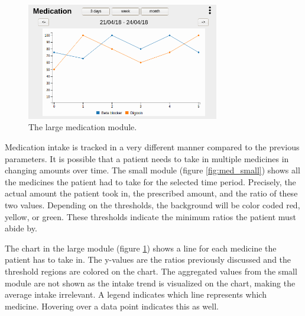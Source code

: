         \begin{figure}[!htb]
            \centering
            \includegraphics[width=0.75\textwidth]{chapters/3_design/mockups/med_large}
            \caption{The large medication module.}\label{fig:med_large}
        \end{figure}

        Medication intake is tracked in a very different manner compared to the previous parameters. It is possible that a patient needs to take in multiple medicines in changing amounts over time. The small module (figure \ref{fig:med_small}) shows all the medicines the patient had to take for the selected time period. Precisely, the actual amount the patient took in, the prescribed amount, and the ratio of these two values. Depending on the thresholds, the background will be color coded red, yellow, or green. These thresholds indicate the minimum ratios the patient must abide by.

        The chart in the large module (figure \ref{fig:med_large}) shows a line for each medicine the patient has to take in. The y-values are the ratios previously discussed and the threshold regions are colored on the chart. The aggregated values from the small module are not shown as the intake trend is visualized on the chart, making the average intake irrelevant. A legend indicates which line represents which medicine. Hovering over a data point indicates this as well.